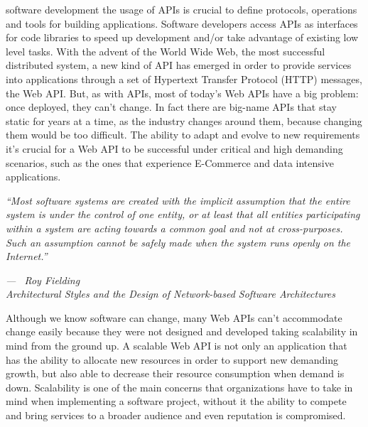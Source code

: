 \documentclass[10pt,article]{IEEEtran}
\begin{document}
% 
% 
% 
% 
 software development the usage of APIs is crucial to define protocols, operations and tools for building applications. Software developers access APIs as interfaces for code libraries to speed up development and/or take advantage of existing low level tasks. With the advent of the World Wide Web, the most successful distributed system, a new kind of API has emerged in order to provide services into applications through a set of Hypertext Transfer Protocol (HTTP) messages, the Web API. But, as with APIs, most of today's Web APIs have a big problem: once deployed, they can't change. In fact there are big-name APIs that stay static for years at a time, as the industry changes around them, because changing them would be too difficult\cite{RESTfulWebAPI:richardson}. The ability to adapt and evolve to new requirements it's crucial for a Web API to be successful under critical and high demanding scenarios, such as the ones that experience E-Commerce and data intensive applications.

 
\epigraph{{\textit{``Most software systems are created with the implicit assumption that the entire system is under the control of one entity, or at least that all entities participating within a system
are acting towards a common goal and not at cross-purposes. Such an assumption cannot
be safely made when the system runs openly on the Internet.''}}}{\textit{--- ~Roy Fielding \\ Architectural Styles and the Design of Network-based Software Architectures}}

Although we know software can change, many Web APIs can't accommodate change easily because they were not designed and developed taking scalability in mind from the ground up. A scalable Web API is not only an application that has the ability to allocate new resources in order to support new demanding growth, but also able to decrease their resource consumption when demand is down. Scalability is one of the main concerns that organizations have to take in mind when implementing a software project, without it the ability to compete and bring services to a broader audience and even reputation is compromised.
\end{document}
